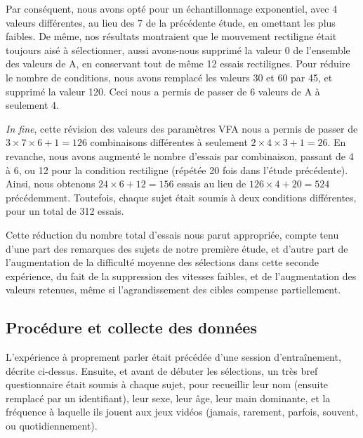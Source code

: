 	Par conséquent, nous avons opté pour un échantillonnage exponentiel, avec 4 valeurs différentes, au lieu des 7 de la précédente étude, en omettant les plus faibles. De même, nos résultats montraient que le mouvement rectiligne était toujours aisé à sélectionner, aussi avons-nous supprimé la valeur 0 de l'ensemble des valeurs de A, en conservant tout de même 12 essais rectilignes. Pour réduire le nombre de conditions, nous avons remplacé les valeurs 30 et 60 par 45, et supprimé la valeur 120. Ceci nous a permis de passer de 6 valeurs de A à seulement 4.
	
	\emph{In fine}, cette révision des valeurs des paramètres VFA nous a permis de passer de $3\times{}7\times{}6+1=126$ combinaisons différentes à seulement $2\times{}4\times{}3+1=26$. En revanche, nous avons augmenté le nombre d'essais par combinaison, passant de 4 à 6, ou 12 pour la condition rectiligne (répétée 20 fois dans l'étude précédente). Ainsi, nous obtenons $24\times{}6+12=156$ essais au lieu de $126\times{}4+20=524$ précédemment. Toutefois, chaque sujet était soumis à deux conditions différentes, pour un total de 312 essais.
	
	Cette réduction du nombre total d'essais nous parut appropriée, compte tenu d'une part des remarques des sujets de notre première étude, et d'autre part de l'augmentation de la difficulté moyenne des sélections dans cette seconde expérience, du fait de la suppression des vitesses faibles, et de l'augmentation des valeurs retenues, même si l'agrandissement des cibles compense partiellement.
	
	\subsection{Procédure et collecte des données}
	L'expérience à proprement parler était précédée d'une session d'entraînement, décrite ci-dessus. Ensuite, et avant de débuter les sélections, un très bref questionnaire était soumis à chaque sujet, pour recueillir leur nom (ensuite remplacé par un identifiant), leur sexe, leur âge, leur main dominante, et la fréquence à laquelle ils jouent aux jeux vidéos (jamais, rarement, parfois, souvent, ou quotidiennement).
	
	
%	
	
